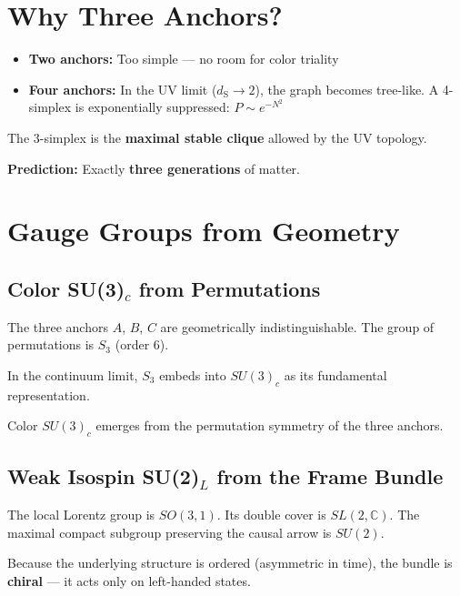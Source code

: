 \documentclass[11pt, a4paper, openany]{book}
\newcommand{\dS}{d_{\mathrm{S}}}
\begin{document}
\section{Why Three Anchors?}

\begin{itemize}
  \item \textbf{Two anchors:} Too simple --- no room for color triality
  \item \textbf{Four anchors:} In the UV limit ($\dS \to 2$), the graph becomes tree-like. A 4-simplex is exponentially suppressed: $P \sim e^{-N^2}$
\end{itemize}

\begin{result}
The 3-simplex is the \textbf{maximal stable clique} allowed by the UV topology.

\textbf{Prediction:} Exactly \textbf{three generations} of matter.
\end{result}

\section{Gauge Groups from Geometry}

\subsection{Color SU(3)$_c$ from Permutations}

The three anchors $A$, $B$, $C$ are geometrically indistinguishable.
The group of permutations is $S_3$ (order 6).

In the continuum limit, $S_3$ embeds into $SU(3)_c$ as its fundamental representation.

\begin{result}
Color $SU(3)_c$ emerges from the permutation symmetry of the three anchors.
\end{result}

\subsection{Weak Isospin SU(2)$_L$ from the Frame Bundle}

The local Lorentz group is $SO(3,1)$.
Its double cover is $SL(2,\mathbb{C})$.
The maximal compact subgroup preserving the causal arrow is $SU(2)$.

Because the underlying structure is ordered (asymmetric in time), the bundle is \textbf{chiral} --- it acts only on left-handed states.
\end{document}
